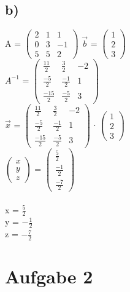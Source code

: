 \documentclass{article}
\begin{document}
	\subsection*{b)}
	A = 
	$\left(\begin{array}{ccc}
	2 & 1 & 1 \\ 0 & 3 & -1 \\ 5 & 5 & 2
	\end{array}\right)$
	$\vec{b}$ =
	$\left(\begin{array}{c}
	1 \\ 2 \\ 3 
	\end{array}\right)$ \\
	$A^{-1}$ =
	$
	\left(\begin{matrix}
	\frac{11}{2} & \frac{3}{2} & -2 \\
	\frac{-5}{2} & \frac{-1}{2} & 1 \\
	\frac{-15}{2} & \frac{-5}{2} & 3
	\end{matrix}\right)
	$ \\
	$\vec{x}$ = 
	$
	\left(\begin{matrix}
	\frac{11}{2} & \frac{3}{2} & -2 \\
	\frac{-5}{2} & \frac{-1}{2} & 1 \\
	\frac{-15}{2} & \frac{-5}{2} & 3
	\end{matrix}\right)
	$  $\cdot$
	$
	\left(\begin{array}{c}
		1 \\ 2 \\ 3 
	\end{array}\right)
	$ \\
	$
	\left(\begin{array}{c}
	x \\ y  \\ z
	\end{array}\right)
	$ =
	$
	\left(\begin{matrix}
	\frac{5}{2} \\
	\frac{-1}{2} \\
	\frac{-7}{2}
	\end{matrix}\right)
	$ \\ \\
	x = $\frac{5}{2}$ \\
	y = $-\frac{1}{2}$ \\
	z = $-\frac{7}{2}$
	
	\section*{Aufgabe 2}
\end{document}
